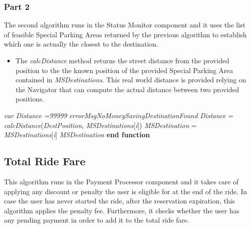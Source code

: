\subsubsection{Part 2}

The second algorithm runs in the Status Monitor component and it uses the list of feasible Special Parking Areas returned by the previous algorithm to establish which one is actually the closest to the destination.

\begin{itemize}
    \item The \textit{calcDistance} method returns the street distance from the provided position to the the known position of the provided Special Parking Area contained in \textit{MSDestinations}. This real world distance is provided relying on the Navigator that can compute the actual distance between two provided positions.
\end{itemize}

\begin{algorithm}
\caption{}\label{euclid}
\begin{algorithmic}[1]
\State \textit{var Distance =99999}
\State\Return \textit{errorMsgNoMoneySavingDestinationFound}
\EndIf
{}
\State \textit{Distance} = \textit{calcDistance}(\textit{DestPosition}, \textit{MSDestinations}[\textit{i}])
\State \textit{MSDestination} = \textit{MSDestinations}[\textit{i}]
\EndIf
\EndFor
\State\Return \textit{MSDestination}
\EndFunction
\State \textbf{end function}
\end{algorithmic}
\end{algorithm}

\newpage


\subsection{Total Ride Fare}
This algorithm runs in the Payment Processor component and it takes care of applying any discount or penalty the user is eligible for at the end of the ride. In case the user has never started the ride, after the reservation expiration, this algorithm applies the penalty fee. Furthermore, it checks whether the user has any pending payment in order to add it to the total ride fare.

